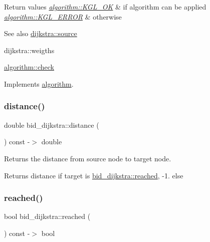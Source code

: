 \begin{DoxyRetVals}{Return values}
{\em \mbox{\hyperlink{classalgorithm_af1a0078e153aa99c24f9bdf0d97f6710aae4c1cd7fe8d8cf4b143241a6e7c31cf}{algorithm\+::\+K\+G\+L\+\_\+\+OK}}} & if algorithm can be applied \\
\hline
{\em \mbox{\hyperlink{classalgorithm_af1a0078e153aa99c24f9bdf0d97f6710ae67bf27b2ef31f73e545a7f9f4a69556}{algorithm\+::\+K\+G\+L\+\_\+\+E\+R\+R\+OR}}} & otherwise\\
\hline
\end{DoxyRetVals}
\begin{DoxySeeAlso}{See also}
\mbox{\hyperlink{classdijkstra_a9689f2628f76ddb3747ea18c91bd7041}{dijkstra\+::source}} 

dijkstra\+::weigths 

\mbox{\hyperlink{classalgorithm_a05c0f25463eb35a77b2d73fc06bb2c0e}{algorithm\+::check}} 
\end{DoxySeeAlso}


Implements \mbox{\hyperlink{classalgorithm_a05c0f25463eb35a77b2d73fc06bb2c0e}{algorithm}}.

\mbox{\label{classbid__dijkstra_ab379dab835a4d06be909f9c91d1e0806}} 
\subsubsection{\texorpdfstring{distance()}{distance()}}
{\footnotesize\ttfamily double bid\+\_\+dijkstra\+::distance (\begin{DoxyParamCaption}{ }\end{DoxyParamCaption}) const -\/$>$ double}



Returns the distance from source node to target node. 

\begin{DoxyReturn}{Returns}
distance if target is \mbox{\hyperlink{classbid__dijkstra_aa2be4417ba3f1a78b0697ce2f7268812}{bid\+\_\+dijkstra\+::reached}}, {\ttfamily -\/1.} else 
\end{DoxyReturn}
\mbox{\label{classbid__dijkstra_aa2be4417ba3f1a78b0697ce2f7268812}} 
\subsubsection{\texorpdfstring{reached()}{reached()}}
{\footnotesize\ttfamily bool bid\+\_\+dijkstra\+::reached (\begin{DoxyParamCaption}{ }\end{DoxyParamCaption}) const -\/$>$ bool}



